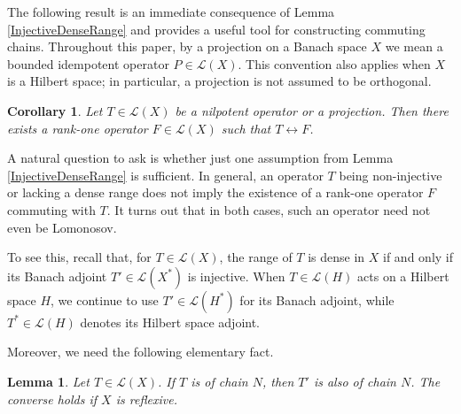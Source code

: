 \documentclass[a4paper,12pt]{article}
\newtheorem{lemma}[thm]{Lemma}
\newtheorem{cor}[thm]{Corollary}
\theoremstyle{definition}
\numberwithin{equation}{section}
\numberwithin{thm}{section}
\begin{document}
The following result is an immediate consequence of Lemma \ref{InjectiveDenseRange} and provides a useful tool for constructing commuting chains. Throughout this paper, by a projection on a Banach space $X$ we mean a bounded idempotent operator $P\in\mathcal{L}(X)$. This convention also applies when $X$ is a Hilbert space; in particular, a projection is not assumed to be orthogonal.

\begin{cor}
\label{ProjectionandFiniteRank}
Let $T\in \mathcal{L}(X)$ be a nilpotent operator or a projection. Then there exists a rank-one operator $F\in \mathcal{L}(X)$ such that $T \leftrightarrow F$. 
\end{cor} 

A natural question to ask is whether just one assumption from Lemma \ref{InjectiveDenseRange} is sufficient. In general, an operator $T$ being non-injective or lacking a dense range does not imply the existence of a rank-one operator $F$ commuting with $T$. It turns out that in both cases, such an operator need not even be Lomonosov.

To see this, recall that, for $T\in\mathcal{L}(X)$, the range of $T$ is dense in $X$ if and only if its Banach adjoint $T'\in\mathcal{L}(X^*)$ is injective. When $T\in\mathcal{L}(H)$ acts on a Hilbert space $H$, we continue to use $T'\in\mathcal{L}(H^*)$ for its Banach adjoint, while $T^*\in\mathcal{L}(H)$ denotes its Hilbert space adjoint.

Moreover, we need the following elementary fact.
\begin{lemma}
\label{adjointChainPreserved}
Let $T\in \mathcal{L}(X)$. If $T$ is of chain $N$, then $T'$ is also of chain $N$. The converse holds if $X$ is reflexive.
\end{lemma}
\end{document}
